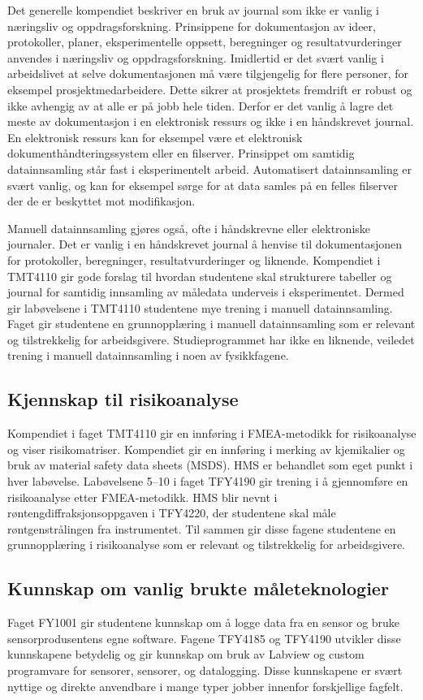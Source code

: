 \documentclass{article}
\begin{document}
Det generelle kompendiet \cite{Persson2020} beskriver en bruk av journal som ikke er vanlig i næringsliv og oppdragsforskning. Prinsippene for dokumentasjon av ideer, protokoller, planer, eksperimentelle oppsett, beregninger og resultatvurderinger anvendes i næringsliv og oppdragsforskning. Imidlertid er det svært vanlig i arbeidslivet at selve dokumentasjonen må være tilgjengelig for flere personer, for eksempel prosjektmedarbeidere. Dette sikrer at prosjektets fremdrift er robust og ikke avhengig av at alle er på jobb hele tiden. Derfor er det vanlig å lagre det meste av dokumentasjon i en elektronisk ressurs og ikke i en håndskrevet journal. En elektronisk ressurs kan for eksempel være et elektronisk dokumenthåndteringssystem eller en filserver.
Prinsippet om samtidig datainnsamling står fast i eksperimentelt arbeid. Automatisert datainnsamling er svært vanlig, og kan for eksempel sørge for at data samles på en felles filserver der de er beskyttet mot modifikasjon.

Manuell datainnsamling gjøres også, ofte i håndskrevne eller elektroniske journaler. Det er vanlig i en håndskrevet journal å henvise til dokumentasjonen for protokoller, beregninger, resultatvurderinger og liknende. Kompendiet i TMT4110 gir gode forslag til hvordan studentene skal strukturere tabeller og journal for samtidig innsamling av måledata underveis i eksperimentet. Dermed gir labøvelsene i TMT4110 studentene mye trening i manuell datainnsamling. Faget gir studentene en grunnopplæring i manuell datainnsamling som er relevant og tilstrekkelig for arbeidsgivere. Studieprogrammet har ikke en liknende, veiledet trening i manuell datainnsamling i noen av fysikkfagene.

\subsection{Kjennskap til risikoanalyse}
Kompendiet i faget TMT4110 gir en innføring i FMEA-metodikk for risikoanalyse og viser risikomatriser. Kompendiet gir en innføring i merking av kjemikalier og bruk av material safety data sheets (MSDS). HMS er behandlet som eget punkt i hver labøvelse. Labøvelsene 5--10 i faget TFY4190 gir trening i å gjennomføre en risikoanalyse etter FMEA-metodikk. HMS blir nevnt i røntengdiffraksjonsoppgaven i TFY4220, der studentene skal måle røntgenstrålingen fra instrumentet.
Til sammen gir disse fagene studentene en grunnopplæring i risikoanalyse som er relevant og tilstrekkelig for arbeidsgivere.

\subsection{Kunnskap om vanlig brukte måleteknologier}
Faget FY1001 gir studentene kunnskap om å logge data fra en sensor og bruke sensorprodusentens egne software. Fagene TFY4185 og TFY4190 utvikler disse kunnskapene betydelig og gir kunnskap om bruk av Labview og custom programvare for sensorer, sensorer, og datalogging. Disse kunnskapene er svært nyttige og direkte anvendbare i mange typer jobber innenfor forskjellige fagfelt.
\end{document}
